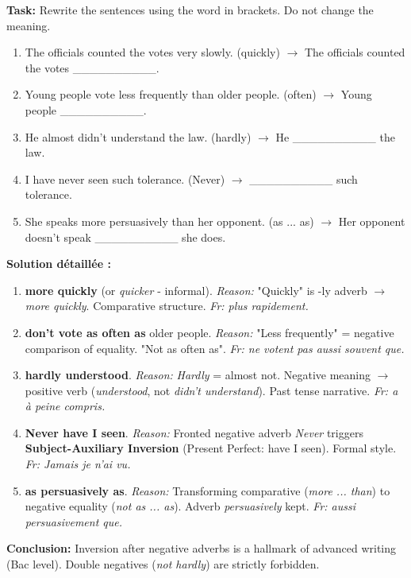 \documentclass[11pt]{article}
\begin{document}
\begin{exoresolu}
    \textbf{Task:} Rewrite the sentences using the word in brackets. Do not change the meaning.
    \begin{enumerate}
        \item The officials counted the votes very slowly. (quickly) $\to$ The officials counted the votes \_\_\_\_\_\_\_\_\_\_.
        \item Young people vote less frequently than older people. (often) $\to$ Young people \_\_\_\_\_\_\_\_\_\_.
        \item He almost didn't understand the law. (hardly) $\to$ He \_\_\_\_\_\_\_\_\_\_ the law.
        \item I have never seen such tolerance. (Never) $\to$ \_\_\_\_\_\_\_\_\_\_ such tolerance.
        \item She speaks more persuasively than her opponent. (as ... as) $\to$ Her opponent doesn't speak \_\_\_\_\_\_\_\_\_\_ she does.
    \end{enumerate}
    \tcblower
    \textbf{Solution détaillée :}
    \begin{enumerate}
        \item \textbf{more quickly} (or \emph{quicker} - informal). \textit{Reason:} "Quickly" is -ly adverb $\to$ \emph{more quickly}. Comparative structure. \textit{Fr: plus rapidement.}
        \item \textbf{don't vote as often as} older people. \textit{Reason:} "Less frequently" = negative comparison of equality. "Not as often as". \textit{Fr: ne votent pas aussi souvent que.}
        \item \textbf{hardly understood}. \textit{Reason:} \emph{Hardly} = almost not. Negative meaning $\to$ positive verb (\emph{understood}, not \emph{didn't understand}). Past tense narrative. \textit{Fr: a à peine compris.}
        \item \textbf{Never have I seen}. \textit{Reason:} Fronted negative adverb \emph{Never} triggers \textbf{Subject-Auxiliary Inversion} (Present Perfect: have I seen). Formal style. \textit{Fr: Jamais je n'ai vu.}
        \item \textbf{as persuasively as}. \textit{Reason:} Transforming comparative (\emph{more ... than}) to negative equality (\emph{not as ... as}). Adverb \emph{persuasively} kept. \textit{Fr: aussi persuasivement que.}
    \end{enumerate}
    \textbf{Conclusion:} Inversion after negative adverbs is a hallmark of advanced writing (Bac level). Double negatives (\emph{not hardly}) are strictly forbidden.
\end{exoresolu}
\end{document}
